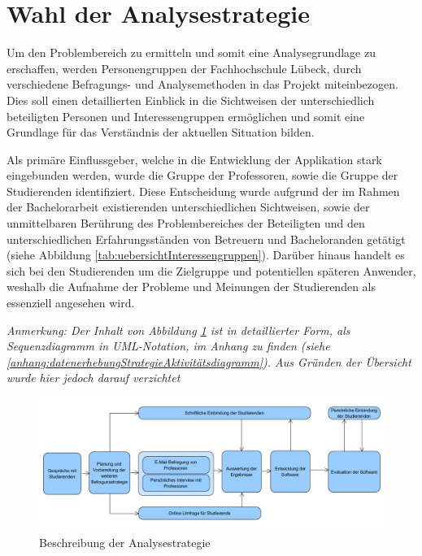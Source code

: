 \documentclass[bibliography=totoc,listof=totoc,BCOR=5mm,DIV=12,oneside]{scrbook}
\begin{document}
\newpage
\section{Wahl der Analysestrategie}
\par Um den Problembereich zu ermitteln und somit eine Analysegrundlage zu erschaffen, werden Personengruppen der Fachhochschule Lübeck, durch verschiedene Befragungs- und Analysemethoden in das Projekt miteinbezogen. Dies soll einen detaillierten Einblick in die Sichtweisen der unterschiedlich beteiligten Personen und Interessengruppen ermöglichen und somit eine Grundlage für das Verständnis der aktuellen Situation bilden.

\par Als primäre Einflussgeber, welche in die Entwicklung der Applikation stark eingebunden werden, wurde die Gruppe der Professoren, sowie die Gruppe der Studierenden identifiziert. Diese Entscheidung wurde aufgrund der im Rahmen der Bachelorarbeit existierenden unterschiedlichen Sichtweisen, sowie der unmittelbaren Berührung des Problembereiches der Beteiligten und den unterschiedlichen Erfahrungsständen von Betreuern und Bacheloranden getätigt (siehe Abbildung \ref{tab:uebersichtInteressengruppen}). Darüber hinaus handelt es sich bei den Studierenden um die Zielgruppe und potentiellen späteren Anwender, weshalb die Aufnahme der Probleme und Meinungen der Studierenden als essenziell angesehen wird. 

\par \bigskip \textit{Anmerkung: Der Inhalt von Abbildung \ref{img:analysestrategie} ist in detaillierter Form, als Sequenzdiagramm in UML-Notation, im Anhang zu finden (siehe \ref{anhang:datenerhebungStrategieAktivitätsdiagramm}). Aus Gründen der Übersicht wurde hier jedoch darauf verzichtet}

\bigskip
\begin{figure}[H]
	\centering
	\includegraphics[width=1\textwidth, keepaspectratio]{Bilder/Diagramme/Analysestrategie.png}
	\caption{Beschreibung der Analysestrategie}
	\label{img:analysestrategie}
\end{figure}
\end{document}
